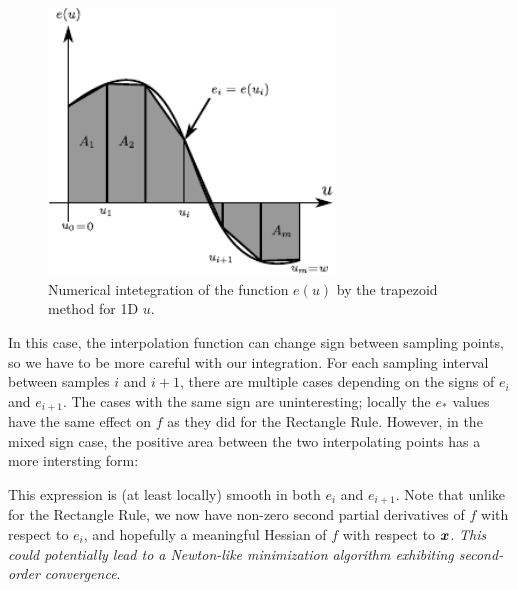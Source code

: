 \documentclass[9.5pt,journal,final,finalsubmission,twocolumn]{IEEEtran}
\begin{document}
\begin{figure}[htb]
 \centering
 \includegraphics[width=3in]{integration_trapezoid.pdf}
 \caption{Numerical intetegration of the function $e(u)$ by the trapezoid method for 1D $u$.}
 \label{fig:trapezoid}
\end{figure}


In this case, the interpolation function can change sign between sampling
points, so we have to be more careful with our integration.  For each sampling
interval between samples $i$ and $i+1$, there are multiple cases depending on
the signs of $e_i$ and $e_{i+1}$.  The cases with the same sign are
uninteresting; locally the $e_*$ values have the same effect on $f$ as they did
for the Rectangle Rule.  However, in the mixed sign case, the positive area
between the two interpolating points has a more intersting form:



This expression is (at least locally) smooth in both $e_i$ and $e_{i+1}$.  Note
that unlike for the Rectangle Rule, we now have non-zero second partial
derivatives of $f$ with respect to $e_i$, and hopefully a meaningful Hessian of
$f$ with respect to ${\boldsymbol{x}}$.  {\em This could potentially lead to a Newton-like
minimization algorithm exhibiting second-order convergence}.  


\end{document}
